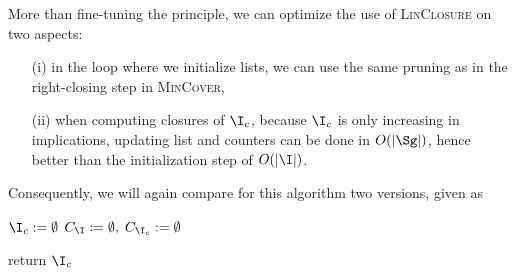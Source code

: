 \vspace{1.2em}

 More than fine-tuning the principle, we can optimize the use of \textsc{LinClosure} on two aspects:
\begin{itemize}
	\item[(i)] in the loop where we initialize lists, we can use the same
	pruning as in the right-closing step in \textsc{MinCover},
	\item[(ii)] when computing closures of $\I_c$, because $\I_c$ is only
	increasing in implications, updating list and counters can be done in $O(|\Sg|)$,	hence better than the initialization step of $O(|\I|)$.
\end{itemize}
\noindent Consequently, we will again compare for this algorithm two versions, given as 

\begin{algorithm}[H]
	
	\BlankLine
	\BlankLine
	
	$\I_c := \emptyset$ \;
	$C_{\I} := \emptyset, \; C_{\I_c} := \emptyset $ \;
	
	
	\BlankLine
	
	
	\BlankLine
	
	return $\I_c$ \;
	

	\label{alg:BercziImpClo}
\end{algorithm}

